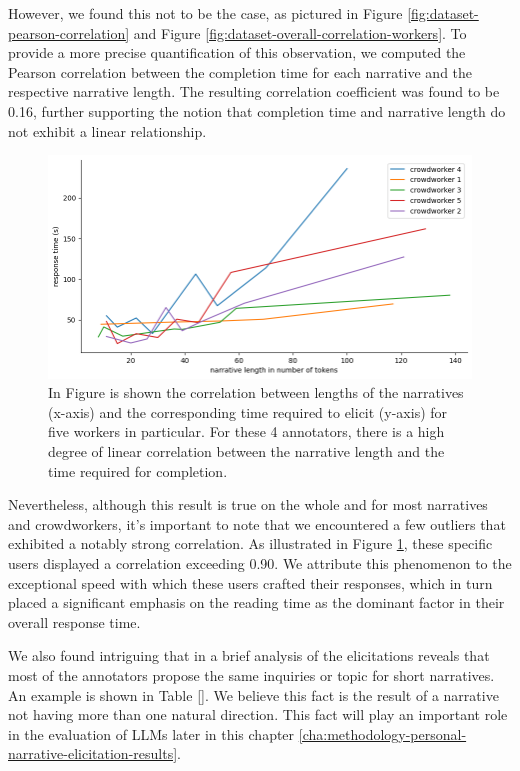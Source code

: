However, we found this not to be the case, as pictured in Figure \ref{fig:dataset-pearson-correlation} and Figure \ref{fig:dataset-overall-correlation-workers}. To provide a more precise quantification of this observation, we computed the Pearson correlation between the completion time for each narrative and the respective narrative length. The resulting correlation coefficient was found to be 0.16, further supporting the notion that completion time and narrative length do not exhibit a linear relationship.

\begin{figure}[!htbp]
        \includegraphics[width=1\linewidth]{assets//imgs/dataset-high-correlation-workers.png}
        \caption{In Figure is shown the correlation between lengths of the narratives (x-axis) and the corresponding time required to elicit (y-axis) for five workers in particular. For these 4 annotators, there is a high degree of linear correlation between the narrative length and the time required for completion.}
        \label{fig:dataset-high-correlation-workers}
\end{figure}
Nevertheless, although this result is true on the whole and for most narratives and crowdworkers, it's important to note that we encountered a few outliers that exhibited a notably strong correlation. As illustrated in Figure \ref{fig:dataset-high-correlation-workers}, these specific users displayed a correlation exceeding 0.90. We attribute this phenomenon to the exceptional speed with which these users crafted their responses, which in turn placed a significant emphasis on the reading time as the dominant factor in their overall response time.

We also found intriguing that in a brief analysis of the elicitations reveals that most of the annotators propose the same inquiries or topic for short narratives. An example is shown in Table \ref{}. We believe this fact is the result of a narrative not having more than one natural direction. This fact will play an important role in the evaluation of LLMs later in this chapter \ref{cha:methodology-personal-narrative-elicitation-results}.
